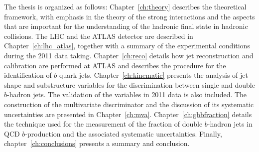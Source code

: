 The thesis is organized as follows: Chapter~\ref{ch:theory} describes the theoretical framework, with emphasis in the theory of the strong interactions and the aspects that are important for the understanding of the hadronic final state in hadronic collisions. The LHC and the ATLAS detector are described in Chapter~\ref{ch:lhc_atlas}, together with a summary of the experimental conditions during the 2011 data taking.  Chapter~\ref{ch:reco} details how jet reconstruction and calibration are performed at ATLAS and describes the procedure for the identification of $b$-quark jets. Chapter~\ref{ch:kinematic} presents the analysis of jet shape and substructure variables for the discrimination between single and double $b$-hadron jets. The validation of the variables in 2011 data is also included.   The construction of the multivariate discriminator  and the discussion of its systematic uncertainties are presented in Chapter~\ref{ch:mva}. 
Chapter~\ref{ch:gbbfraction} details the technique used for the measurement of the fraction of double $b$-hadron jets in QCD $b$-production and the associated systematic uncertainties.
Finally, chapter~\ref{ch:conclusions} presents a summary and conclusion. 




